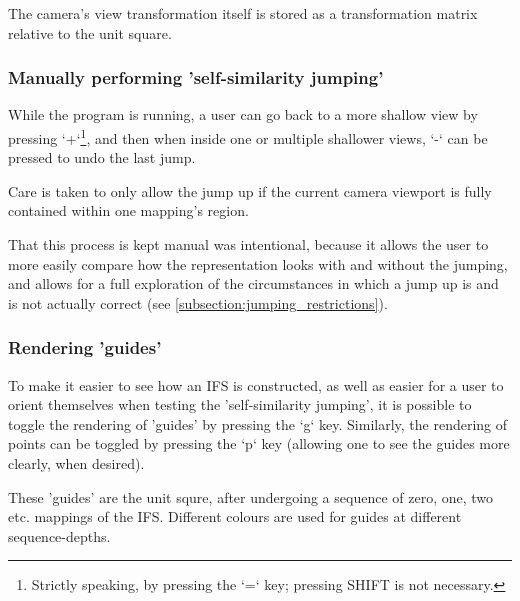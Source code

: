 \documentclass[11pt]{article}
\begin{document}
The camera's view transformation itself is stored as a transformation matrix relative to the unit square.

\subsubsection{Manually performing 'self-similarity jumping'}
\label{sec:orgefe09b0}

While the program is running, a user can go back to a more shallow view by pressing `+`\footnote{Strictly speaking, by pressing the `=` key; pressing SHIFT is not necessary.}, and then when inside one or multiple shallower views,
`-` can be pressed to undo the last jump.

Care is taken to only allow the jump up if the current camera viewport is fully contained within one mapping's region.

That this process is kept manual was intentional, because it allows the user to more easily compare how
the representation looks with and without the jumping, and allows for a full exploration of the circumstances
in which a jump up is and is not actually correct (see \autoref{subsection:jumping_restrictions}).
\subsubsection{Rendering 'guides'}
\label{sec:org76daa23}

To make it easier to see how an IFS is constructed, as well as easier for a user to orient themselves when
testing the 'self-similarity jumping', it is possible to toggle the rendering of 'guides' by pressing the `g` key.
Similarly, the rendering of points can be toggled by pressing the `p` key (allowing one to see the guides more clearly, when desired).

These 'guides' are the unit squre, after undergoing a sequence of zero, one, two etc. mappings of the IFS.
Different colours are used for guides at different sequence-depths.
\end{document}
